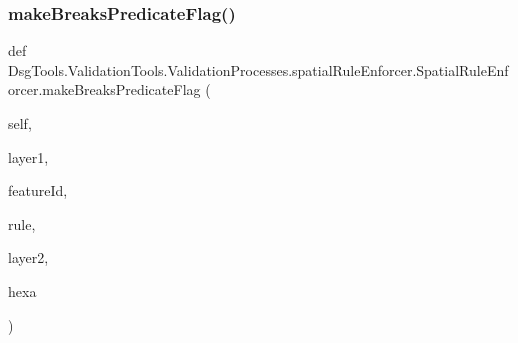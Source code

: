 \subsubsection{\texorpdfstring{make\+Breaks\+Predicate\+Flag()}{makeBreaksPredicateFlag()}}
{\footnotesize\ttfamily def Dsg\+Tools.\+Validation\+Tools.\+Validation\+Processes.\+spatial\+Rule\+Enforcer.\+Spatial\+Rule\+Enforcer.\+make\+Breaks\+Predicate\+Flag (\begin{DoxyParamCaption}\item[{}]{self,  }\item[{}]{layer1,  }\item[{}]{feature\+Id,  }\item[{}]{rule,  }\item[{}]{layer2,  }\item[{}]{hexa }\end{DoxyParamCaption})}

